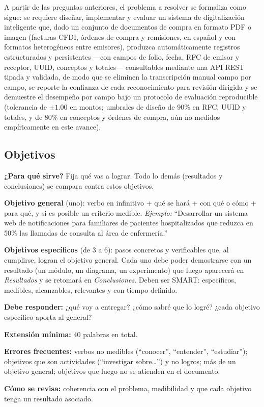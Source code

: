 A partir de las preguntas anteriores, el problema a resolver se formaliza como sigue: se requiere diseñar, implementar y evaluar un sistema de digitalización inteligente que, dado un conjunto de documentos de compra en formato PDF o imagen (facturas CFDI, órdenes de compra y remisiones, en español y con formatos heterogéneos entre emisores), produzca automáticamente registros estructurados y persistentes —con campos de folio, fecha, RFC de emisor y receptor, UUID, conceptos y totales— consultables mediante una API REST tipada y validada, de modo que se eliminen la transcripción manual campo por campo, se reporte la confianza de cada reconocimiento para revisión dirigida y se demuestre el desempeño por campo bajo un protocolo de evaluación reproducible (tolerancia de $\pm 1.00$ en montos; umbrales de diseño de 90\% en RFC, UUID y totales, y de 80\% en conceptos y órdenes de compra, aún no medidos empíricamente en este avance).


\subsection{Objetivos} \label{sec:objetivos} %

\begin{guia}
\textbf{¿Para qué sirve?} Fija qué vas a lograr. Todo lo demás (resultados y conclusiones) se compara contra estos objetivos.

\textbf{Objetivo general} (uno): verbo en infinitivo + qué se hará + con qué o cómo + para qué, y si es posible un criterio
medible. \emph{Ejemplo:} ``Desarrollar un sistema web de notificaciones para familiares de pacientes hospitalizados que
reduzca en 50\% las llamadas de consulta al área de enfermería.''

\textbf{Objetivos específicos} (de 3 a 6): pasos concretos y verificables que, al cumplirse, logran el objetivo general.
Cada uno debe poder demostrarse con un resultado (un módulo, un diagrama, un experimento) que luego aparecerá en
\emph{Resultados} y se retomará en \emph{Conclusiones}. Deben ser SMART: específicos, medibles, alcanzables, relevantes y
con tiempo definido.

\textbf{Debe responder:} ¿qué voy a entregar? ¿cómo sabré que lo logré? ¿cada objetivo específico aporta al general?

\textbf{Extensión mínima:} 40 palabras en total.

\textbf{Errores frecuentes:} verbos no medibles (``conocer'', ``entender'', ``estudiar''); objetivos que son actividades
(``investigar sobre\ldots'') y no logros; más de un objetivo general; objetivos que luego no se atienden en el documento.

\textbf{Cómo se revisa:} coherencia con el problema, medibilidad y que cada objetivo tenga un resultado asociado.
\end{guia}

